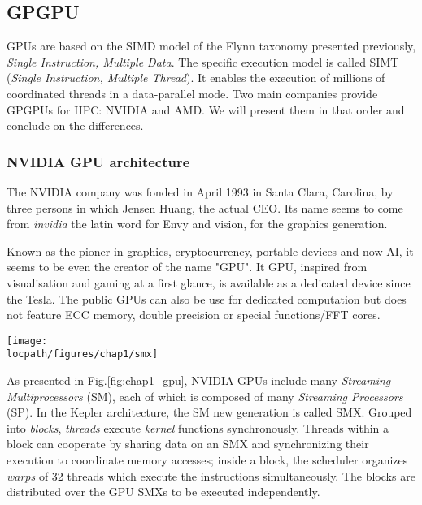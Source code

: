 \subsection{GPGPU}

GPUs are based on the SIMD model of the Flynn taxonomy presented previously, \emph{Single Instruction, Multiple Data}.
The specific execution model is called SIMT (\emph{Single Instruction, Multiple Thread}). It enables the execution of millions of coordinated threads in a data-parallel mode. 
Two main companies provide GPGPUs for HPC: NVIDIA and AMD.
We will present them in that order and conclude on the differences. 

\subsubsection{NVIDIA GPU architecture}

The NVIDIA company was fonded in April 1993 in Santa Clara, Carolina, by three persons in which Jensen Huang, the actual CEO.
Its name seems to come from \textit{invidia} the latin word for Envy and vision, for the graphics generation. 

Known as the pioner in graphics, cryptocurrency, portable devices and now AI, it seems to be even the creator of the name "GPU".
It GPU, inspired from visualisation and gaming at a first glance, is available as a dedicated device  since the Tesla. 
The public GPUs can also be use for dedicated computation but does not feature ECC memory, double precision or special functions/FFT cores. 

\begin{figure*}[t!]
\centering
\setlength\fboxsep{0pt}
\setlength\fboxrule{0.25pt}
\texttt{[image: \\locpath/figures/chap1/smx]}
\caption{NVIDIA GPU and CUDA architecture overview}
 \label{fig:chap1_gpu}
\end{figure*}

As presented in Fig.\ref{fig:chap1_gpu}, NVIDIA GPUs include many \emph{Streaming Multiprocessors} (SM), each of which is composed of many \emph{Streaming Processors} (SP). In the Kepler architecture, the SM new generation is called SMX.
%
Grouped into \emph{blocks}, \textit{threads} execute \emph{kernel} functions synchronously.
Threads within a block can cooperate by sharing data on an SMX and synchronizing their execution to coordinate memory accesses; inside a block, the scheduler organizes \emph{warps} of 32 threads which execute the instructions simultaneously.
The blocks are distributed over the GPU SMXs to be executed independently.

